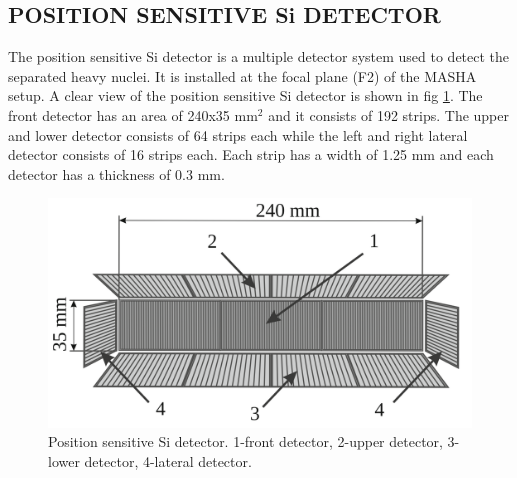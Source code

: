 \documentclass[12pt]{article}
\begin{document}
\subsection{POSITION SENSITIVE Si DETECTOR}
The position sensitive Si detector is a multiple detector system used to detect the separated heavy nuclei. It is installed at the focal plane (F2) of the MASHA setup. A clear view of the position sensitive Si detector is shown in fig \ref{Position sensitive Si detector. 1-front detector, 2-upper detector, 3-lower detector, 4-lateral detector.}. The front detector has an area of 240x35 mm$^2$ and it consists of 192 strips. The upper and lower detector consists of 64 strips each while the left and right lateral detector consists of 16 strips each. Each strip has a width of 1.25 mm and each detector has a thickness of 0.3 mm.\cite{rodin2014separation, rodin2014masha, rodin2020features}


\begin{figure}[h]
\centering
\includegraphics[scale=.372]{Detector.png}
\caption{Position sensitive Si detector. 1-front detector, 2-upper detector, 3-lower detector, 4-lateral detector.}
\label{Position sensitive Si detector. 1-front detector, 2-upper detector, 3-lower detector, 4-lateral detector.}
\end{figure}
\end{document}
